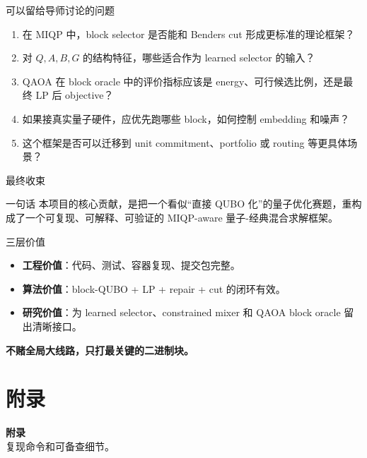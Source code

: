 \documentclass[aspectratio=169]{beamer}
\newcommand{\sectionframe}[2]{
\begin{frame}[plain]
  \vfill
  \begin{center}
    {\Large\bfseries #1}\\[2mm]
    {\small #2}
  \end{center}
  \vfill
\end{frame}
}
\begin{document}
\begin{frame}{可以留给导师讨论的问题}
\small
\begin{enumerate}
  \item 在 MIQP 中，block selector 是否能和 Benders cut 形成更标准的理论框架？
  \item 对 $Q,A,B,G$ 的结构特征，哪些适合作为 learned selector 的输入？
  \item QAOA 在 block oracle 中的评价指标应该是 energy、可行候选比例，还是最终 LP 后 objective？
  \item 如果接真实量子硬件，应优先跑哪些 block，如何控制 embedding 和噪声？
  \item 这个框架是否可以迁移到 unit commitment、portfolio 或 routing 等更具体场景？
\end{enumerate}
\end{frame}

\begin{frame}{最终收束}
\small
\begin{alertblock}{一句话}
本项目的核心贡献，是把一个看似“直接 QUBO 化”的量子优化赛题，重构成了一个可复现、可解释、可验证的 MIQP-aware 量子-经典混合求解框架。
\end{alertblock}
\begin{block}{三层价值}
\begin{itemize}
  \item \textbf{工程价值}：代码、测试、容器复现、提交包完整。
  \item \textbf{算法价值}：block-QUBO + LP + repair + cut 的闭环有效。
  \item \textbf{研究价值}：为 learned selector、constrained mixer 和 QAOA block oracle 留出清晰接口。
\end{itemize}
\end{block}
\centering
\Large\textbf{不赌全局大线路，只打最关键的二进制块。}
\end{frame}

\appendix
\section{附录}
\sectionframe{附录}{复现命令和可备查细节。}
\end{document}
